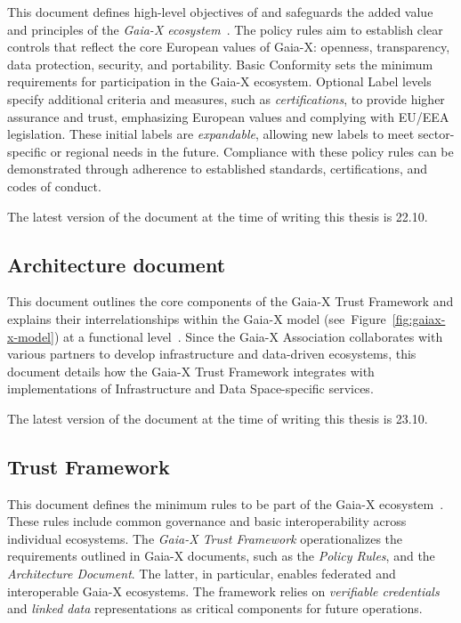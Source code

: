 This document defines high-level objectives of and safeguards the added value and principles of the \textit{Gaia-X ecosystem}~\cite{gaiax_policy_rules}.
The policy rules aim to establish clear controls that reflect the core European values of Gaia-X: openness, transparency, data protection, security, and portability.
Basic Conformity sets the minimum requirements for participation in the Gaia-X ecosystem.
Optional Label levels specify additional criteria and measures, such as \textit{certifications}, to provide higher assurance and trust, emphasizing European values and complying with EU/EEA legislation.
These initial labels are \textit{expandable}, allowing new labels to meet sector-specific or regional needs in the future.
Compliance with these policy rules can be demonstrated through adherence to established standards, certifications, and codes of conduct.

The latest version of the document at the time of writing this thesis is 22.10.

\subsection{Architecture document}\label{subsec:architecture-document}

This document outlines the core components of the Gaia-X Trust Framework and explains their interrelationships within the Gaia-X model (see~Figure~\ref{fig:gaiax-x-model}) at a functional level~\cite{gaiax_architecture_document}.
Since the Gaia-X Association collaborates with various partners to develop infrastructure and data-driven ecosystems, this document details how the Gaia-X Trust Framework integrates with implementations of Infrastructure and Data Space-specific services.

The latest version of the document at the time of writing this thesis is 23.10.

\subsection{Trust Framework}\label{subsec:trust-framework}

This document defines the minimum rules to be part of the Gaia-X ecosystem~\cite{gaiax_trust_framework}.
These rules include common governance and basic interoperability across individual ecosystems.
The \textit{Gaia-X Trust Framework} operationalizes the requirements outlined in Gaia-X documents, such as the \textit{Policy Rules}, and the \textit{Architecture Document}.
The latter, in particular, enables federated and interoperable Gaia-X ecosystems.
The framework relies on \textit{verifiable credentials} and \textit{linked data} representations as critical components for future operations.

